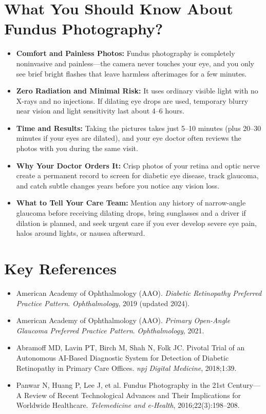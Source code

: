 \section{What You Should Know About Fundus Photography?}

\begin{itemize}
    \item \textbf{Comfort and Painless Photos:} Fundus photography is completely noninvasive and painless---the camera never touches your eye, and you only see brief bright flashes that leave harmless afterimages for a few minutes.
    \item \textbf{Zero Radiation and Minimal Risk:} It uses ordinary visible light with no X-rays and no injections. If dilating eye drops are used, temporary blurry near vision and light sensitivity last about 4--6 hours.
    \item \textbf{Time and Results:} Taking the pictures takes just 5--10 minutes (plus 20--30 minutes if your eyes are dilated), and your eye doctor often reviews the photos with you during the same visit.
    \item \textbf{Why Your Doctor Orders It:} Crisp photos of your retina and optic nerve create a permanent record to screen for diabetic eye disease, track glaucoma, and catch subtle changes years before you notice any vision loss.
    \item \textbf{What to Tell Your Care Team:} Mention any history of narrow-angle glaucoma before receiving dilating drops, bring sunglasses and a driver if dilation is planned, and seek urgent care if you ever develop severe eye pain, halos around lights, or nausea afterward.
\end{itemize}

\section{Key References}

\begin{itemize}
    \item American Academy of Ophthalmology (AAO). \textit{Diabetic Retinopathy Preferred Practice Pattern}. \textit{Ophthalmology}, 2019 (updated 2024).
    \item American Academy of Ophthalmology (AAO). \textit{Primary Open-Angle Glaucoma Preferred Practice Pattern}. \textit{Ophthalmology}, 2021.
    \item Abramoff MD, Lavin PT, Birch M, Shah N, Folk JC. Pivotal Trial of an Autonomous AI-Based Diagnostic System for Detection of Diabetic Retinopathy in Primary Care Offices. \textit{npj Digital Medicine}, 2018;1:39.
    \item Panwar N, Huang P, Lee J, et al. Fundus Photography in the 21st Century---A Review of Recent Technological Advances and Their Implications for Worldwide Healthcare. \textit{Telemedicine and e-Health}, 2016;22(3):198--208.
\end{itemize}
